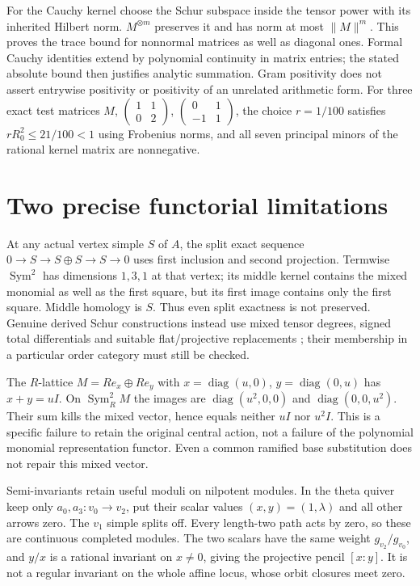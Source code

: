 For the Cauchy kernel choose the Schur subspace inside the tensor power with its inherited Hilbert norm. $M^{\otimes m}$ preserves it and has norm at most $\|M\|^m$. This proves the trace bound for nonnormal matrices as well as diagonal ones. Formal Cauchy identities extend by polynomial continuity in matrix entries; the stated absolute bound then justifies analytic summation. Gram positivity does not assert entrywise positivity or positivity of an unrelated arithmetic form. For three exact test matrices $M$, $\left(\begin{smallmatrix}1&1\\0&2\end{smallmatrix}\right)$, $\left(\begin{smallmatrix}0&1\\-1&1\end{smallmatrix}\right)$, the choice $r=1/100$ satisfies $rR_0^2\le21/100<1$ using Frobenius norms, and all seven principal minors of the rational kernel matrix are nonnegative.

\section{Two precise functorial limitations}
At any actual vertex simple $S$ of $A$, the split exact sequence $0\to S\to S\oplus S\to S\to0$ uses first inclusion and second projection. Termwise $\operatorname{Sym}^2$ has dimensions $1,3,1$ at that vertex; its middle kernel contains the mixed monomial as well as the first square, but its first image contains only the first square. Middle homology is $S$. Thus even split exactness is not preserved. Genuine derived Schur constructions instead use mixed tensor degrees, signed total differentials and suitable flat/projective replacements \cite{SchurComplexes,DerivedSchur}; their membership in a particular order category must still be checked.

The $R$-lattice $M=R e_x\oplus R e_y$ with $x=\operatorname{diag}(u,0)$, $y=\operatorname{diag}(0,u)$ has $x+y=uI$. On $\operatorname{Sym}^2_RM$ the images are $\operatorname{diag}(u^2,0,0)$ and $\operatorname{diag}(0,0,u^2)$. Their sum kills the mixed vector, hence equals neither $uI$ nor $u^2I$. This is a specific failure to retain the original central action, not a failure of the polynomial monomial representation functor. Even a common ramified base substitution does not repair this mixed vector.

Semi-invariants retain useful moduli on nilpotent modules. In the theta quiver keep only $a_0,a_3:v_0\to v_2$, put their scalar values $(x,y)=(1,\lambda)$ and all other arrows zero. The $v_1$ simple splits off. Every length-two path acts by zero, so these are continuous completed modules. The two scalars have the same weight $g_{v_2}/g_{v_0}$, and $y/x$ is a rational invariant on $x\ne0$, giving the projective pencil $[x:y]$. It is not a regular invariant on the whole affine locus, whose orbit closures meet zero.

